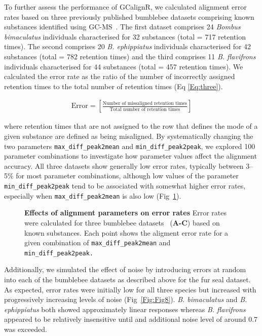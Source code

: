 \documentclass[10pt,letterpaper]{article}
\begin{document}
To further assess the performance of GCalignR, we calculated alignment error rates based on three previously published bumblebee datasets comprising known substances identified using GC-MS~\cite{Dellicour.2013}. The first dataset comprises 24 \textit{Bombus bimaculatus} individuals characterised for 32 substances (total = 717 retention times).  The second comprises 20 \textit{B. ephippiatus} individuals characterised for 42 substances (total = 782 retention times) and the third comprises 11 \textit{B. flavifrons} individuals characterised for 44 substances (total = 457 retention times). We calculated the error rate as the ratio of the number of incorrectly assigned retention times to the total number of retention times (Eq \eqref{Eq:three}).

\begin{eqnarray}
\label{Eq:three}
\mathrm{Error} = \left[\frac{\textrm{Number of missaligned retention times}}{\textrm{Total number of retention times}}\right] 
\end{eqnarray}

where retention times that are not assigned to the row that defines the mode of a given substance are defined as being misaligned. By systematically changing the two parameters \texttt{max\_diff\_peak2mean} and \texttt{min\_diff\_peak2peak}, we explored 100 parameter combinations to investigate how parameter values affect the alignment accuracy. All three datasets show generally low error rates, typically between 3–5\% for most parameter combinations, although low values of the parameter \texttt{min\_diff\_peak2peak} tend to be associated with somewhat higher error rates, especially when \texttt{max\_diff\_peak2mean} is also low (Fig~\ref{Fig:Fig7}).

\begin{figure}[htbp]
\centering
\caption{\textbf{Effects of alignment parameters on error rates}
Error rates were calculated for three bumblebee datasets~\cite{Dellicour.2013}  (\textbf{A-C}) based on known substances. Each point shows the aligment error rate for a given combination of \texttt{max\_diff\_peak2mean} and \texttt{min\_diff\_peak2peak.}}
\label{Fig:Fig7}
\end{figure} 

Additionally, we simulated the effect of noise by introducing errors at random into each of the bumblebee datasets as described above for the fur seal dataset. As expected, error rates were initially low for all three species but increased with progressively increasing levels of noise (Fig~\ref{Fig:Fig8}).  \textit{B. bimaculatus} and \textit{B. ephippiatus} both showed approximately linear responses whereas \textit{B. flavifrons} appeared to be relatively insensitive until and additional noise level of around 0.7 was exceeded.
\end{document}
